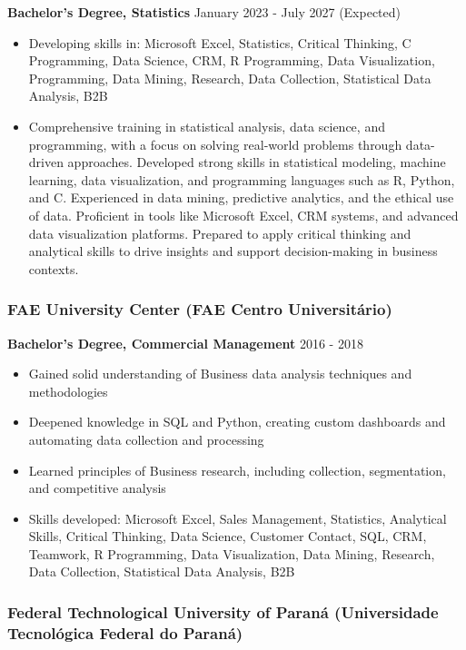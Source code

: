 \documentclass[
]{article}
\providecommand{\tightlist}{%
  \setlength{\itemsep}{0pt}\setlength{\parskip}{0pt}}
\begin{document}
\textbf{Bachelor's Degree, Statistics} \textbar{} January 2023 - July
2027 (Expected)

\begin{itemize}
\item
  Developing skills in: Microsoft Excel, Statistics, Critical Thinking,
  C Programming, Data Science, CRM, R Programming, Data Visualization,
  Programming, Data Mining, Research, Data Collection, Statistical Data
  Analysis, B2B
\item
  Comprehensive training in statistical analysis, data science, and
  programming, with a focus on solving real-world problems through
  data-driven approaches. Developed strong skills in statistical
  modeling, machine learning, data visualization, and programming
  languages such as R, Python, and C. Experienced in data mining,
  predictive analytics, and the ethical use of data. Proficient in tools
  like Microsoft Excel, CRM systems, and advanced data visualization
  platforms. Prepared to apply critical thinking and analytical skills
  to drive insights and support decision-making in business contexts.
\end{itemize}

\subsubsection{FAE University Center (FAE Centro
Universitário)}\label{fae-university-center-fae-centro-universituxe1rio}

\textbf{Bachelor's Degree, Commercial Management} \textbar{} 2016 - 2018

\begin{itemize}
\tightlist
\item
  Gained solid understanding of Business data analysis techniques and
  methodologies
\item
  Deepened knowledge in SQL and Python, creating custom dashboards and
  automating data collection and processing
\item
  Learned principles of Business research, including collection,
  segmentation, and competitive analysis
\item
  Skills developed: Microsoft Excel, Sales Management, Statistics,
  Analytical Skills, Critical Thinking, Data Science, Customer Contact,
  SQL, CRM, Teamwork, R Programming, Data Visualization, Data Mining,
  Research, Data Collection, Statistical Data Analysis, B2B
\end{itemize}

\subsubsection{Federal Technological University of Paraná (Universidade
Tecnológica Federal do
Paraná)}\label{federal-technological-university-of-paranuxe1-universidade-tecnoluxf3gica-federal-do-paranuxe1}
\end{document}
